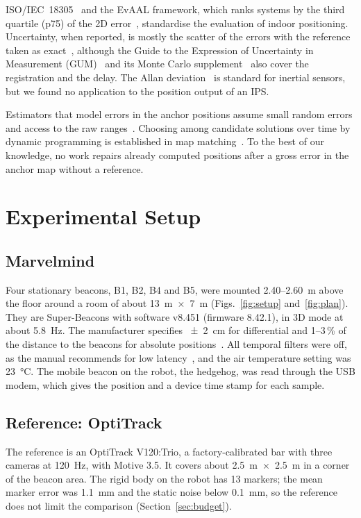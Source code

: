 \documentclass[conference]{IEEEtran}
\begin{document}
ISO/IEC~18305~\cite{iso2016rtls} and the EvAAL framework, which ranks systems by the third quartile
(p75) of the 2D error~\cite{potorti2017comparing}, standardise the evaluation of indoor positioning.
Uncertainty, when reported, is mostly the scatter of the errors with the reference taken as
exact~\cite{neuber2022evaluation}, although the Guide to the Expression of Uncertainty in Measurement
(GUM)~\cite{gum2008} and its Monte Carlo supplement~\cite{jcgm101} also cover the registration and the
delay. The Allan deviation~\cite{allan1966statistics} is standard for inertial sensors, but we found no
application to the position output of an IPS.

Estimators that model errors in the anchor positions assume small random errors and access to the raw
ranges~\cite{ho2007source}. Choosing among candidate solutions over time by dynamic programming is
established in map matching~\cite{newson2009hidden}. To
the best of our knowledge, no work repairs already computed positions after a gross error in the anchor
map without a reference.

\section{Experimental Setup}
\subsection{Marvelmind}
Four stationary beacons, B1, B2, B4 and B5, were mounted 2.40--\SI{2.60}{m} above the floor around a
room of about \SI{13}{m}~$\times$~\SI{7}{m} (Figs.~\ref{fig:setup} and~\ref{fig:plan}). They are
Super-Beacons with software v8.451 (firmware 8.42.1), in 3D mode at about \SI{5.8}{Hz}. The manufacturer specifies
\SI{\pm 2}{cm} for differential and 1--3\,\% of the distance to the beacons for absolute
positions~\cite{marvelmind2024superbeacon}. All temporal filters were off, as the manual recommends for
low latency~\cite{marvelmind2026manual}, and the air temperature setting was \SI{23}{\celsius}. The
mobile beacon on the robot, the hedgehog, was read through the USB modem, which gives the position and a
device time stamp for each sample.

\subsection{Reference: OptiTrack}
The reference is an OptiTrack V120:Trio, a factory-calibrated bar with three cameras at
\SI{120}{Hz}, with Motive 3.5. It covers about
\SI{2.5}{m}~$\times$~\SI{2.5}{m} in a corner of the beacon area. The rigid body on the robot has 13
markers; the mean marker error was \SI{1.1}{mm} and the static noise below \SI{0.1}{mm}, so the
reference does not limit the comparison (Section~\ref{sec:budget}).
\end{document}
